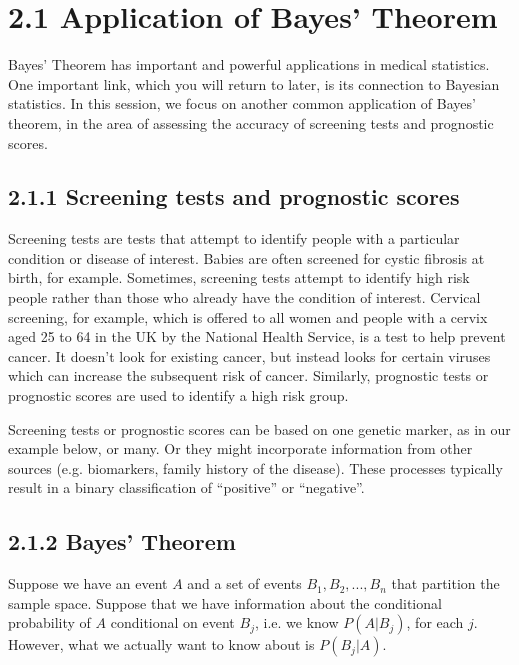 \documentclass[letterpaper,10pt,english]{jupyterBook}
\begin{document}
\section{2.1 Application of Bayes’ Theorem}
\label{\detokenize{02.b. Probability.Discrete:application-of-bayes-theorem}}\label{\detokenize{02.b. Probability.Discrete::doc}}
\sphinxAtStartPar
Bayes’ Theorem has important and powerful applications in medical statistics. One important link, which you will return to later, is its connection to Bayesian statistics. In this session, we focus on another common application of Bayes’ theorem, in the area of assessing the accuracy of screening tests and prognostic scores.


\subsection{2.1.1 Screening tests and prognostic scores}
\label{\detokenize{02.b. Probability.Discrete:screening-tests-and-prognostic-scores}}
\sphinxAtStartPar
Screening tests are tests that attempt to identify people with a particular condition or disease of interest. Babies are often screened for cystic fibrosis at birth, for example. Sometimes, screening tests attempt to identify high risk people rather than those who already have the condition of interest. Cervical screening, for example, which is offered to all women and people with a cervix aged 25 to 64 in the UK by the National Health Service, is a test to help prevent cancer. It doesn’t look for existing cancer, but instead looks for certain viruses which can increase the subsequent risk of cancer. Similarly, prognostic tests or prognostic scores are used to identify a high risk group.

\sphinxAtStartPar
Screening tests or prognostic scores can be based on one genetic marker, as in our example below, or many. Or they might incorporate information from other sources (e.g. biomarkers, family history of the disease). These processes typically result in a binary classification of “positive” or “negative”.


\subsection{2.1.2 Bayes’ Theorem}
\label{\detokenize{02.b. Probability.Discrete:bayes-theorem}}
\sphinxAtStartPar
Suppose we have an event \(A\) and a set of events \(B_1, B_2, ..., B_n\) that partition the sample space. Suppose that we have information about the conditional probability of \(A\) conditional on event \(B_j\), i.e. we know \(P(A | B_j)\), for each \(j\). However, what we actually want to know about is \(P(B_j | A)\).
\end{document}
